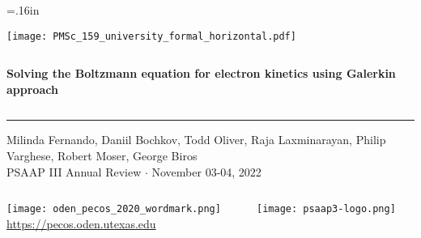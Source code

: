 \documentclass[mathserif, aspectratio=169]{beamer}
\begin{document}


\hoffset=.16in

\begin{frame}[plain,t]{}
\makeatletter
\texttt{[image: PMSc\_159\_university\_formal\_horizontal.pdf]} \newline
\begin{columns}[T,onlytextwidth]
{\bf \color{burntorange} \selectfont 
Solving the Boltzmann equation for electron kinetics using Galerkin approach
}
\end{columns}
\vspace*{.15cm}
\rule{.8\textwidth}{0.6pt} \newline

\vspace*{0.05cm}
{\selectfont
  { \scriptsize
    Milinda Fernando, Daniil Bochkov, Todd Oliver, Raja Laxminarayan, Philip Varghese, Robert Moser, George Biros  \\
  }
  {\color{burntorange} \tiny
    PSAAP III Annual Review $\cdot$ November 03-04, 2022
  }
}

\vspace*{1cm}
\begin{columns}
\begin{column}{0.8\linewidth}
\texttt{[image: oden\_pecos\_2020\_wordmark.png]}\\
{\scriptsize \url{https://pecos.oden.utexas.edu}}
\end{column}

\begin{column}{0.2\linewidth}
\texttt{[image: psaap3-logo.png]}
\end{column}
\end{columns}

\end{frame}
\hoffset=0in
\end{document}
